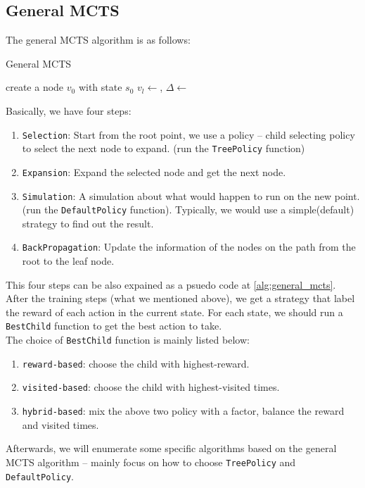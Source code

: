 \documentclass{article}
\begin{document}
\subsection{General MCTS}
The general MCTS algorithm is as follows:
\begin{algorithm}[H]
    \caption{General MCTS}
    \begin{algorithmic}[1]
            \State create a node $v_0$ with state $s_0$
                \State $v_l\gets$, $\Delta\gets$
                \State {}
            \EndWhile
            \State \Return {}
        \EndFunction
    \end{algorithmic}
    \label{alg:general_mcts}
\end{algorithm}
Basically, we have four steps:
\begin{enumerate}
    \item \texttt{Selection}: Start from the root point, we use a policy -- child selecting policy to select the next node to expand. (run the \texttt{TreePolicy} function)
    \item \texttt{Expansion}: Expand the selected node and get the next node. 
    \item \texttt{Simulation}: A simulation about what would happen to run on the new point. (run the \texttt{DefaultPolicy} function). Typically, we would use a simple(default) strategy to find out the result.
    \item \texttt{BackPropagation}: Update the information of the nodes on the path from the root to the leaf node.
\end{enumerate}
This four steps can be also expained as a psuedo code at \ref{alg:general_mcts}.\\
After the training steps (what we mentioned above), we get a strategy that label the reward of each action in the current state. For each state, we should run a \texttt{BestChild} function to get the best action to take.\\
The choice of \texttt{BestChild} function is mainly listed below:
\begin{enumerate}
    \item \texttt{reward-based}: choose the child with highest-reward.
    \item \texttt{visited-based}: choose the child with highest-visited times.
    \item \texttt{hybrid-based}: mix the above two policy with a factor, balance the reward and visited times.
\end{enumerate}
Afterwards, we will enumerate some specific algorithms based on the general MCTS algorithm -- mainly focus on how to choose \texttt{TreePolicy} and \texttt{DefaultPolicy}.
\end{document}
